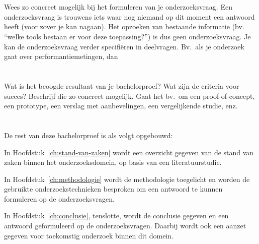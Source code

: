 \section{}%
\label{sec:onderzoeksvraag}

Wees zo concreet mogelijk bij het formuleren van je onderzoeksvraag. Een onderzoeksvraag is trouwens iets waar nog niemand op dit moment een antwoord heeft (voor zover je kan nagaan). Het opzoeken van bestaande informatie (bv. ``welke tools bestaan er voor deze toepassing?'') is dus geen onderzoeksvraag. Je kan de onderzoeksvraag verder specifiëren in deelvragen. Bv.~als je onderzoek gaat over performantiemetingen, dan

\section{}%
\label{sec:onderzoeksdoelstelling}

Wat is het beoogde resultaat van je bachelorproef? Wat zijn de criteria voor succes? Beschrijf die zo concreet mogelijk. Gaat het bv.\ om een proof-of-concept, een prototype, een verslag met aanbevelingen, een vergelijkende studie, enz.

\section{}%
\label{sec:opzet-bachelorproef}


De rest van deze bachelorproef is als volgt opgebouwd:

In Hoofdstuk~\ref{ch:stand-van-zaken} wordt een overzicht gegeven van de stand van zaken binnen het onderzoeksdomein, op basis van een literatuurstudie.

In Hoofdstuk~\ref{ch:methodologie} wordt de methodologie toegelicht en worden de gebruikte onderzoekstechnieken besproken om een antwoord te kunnen formuleren op de onderzoeksvragen.


In Hoofdstuk~\ref{ch:conclusie}, tenslotte, wordt de conclusie gegeven en een antwoord geformuleerd op de onderzoeksvragen. Daarbij wordt ook een aanzet gegeven voor toekomstig onderzoek binnen dit domein.